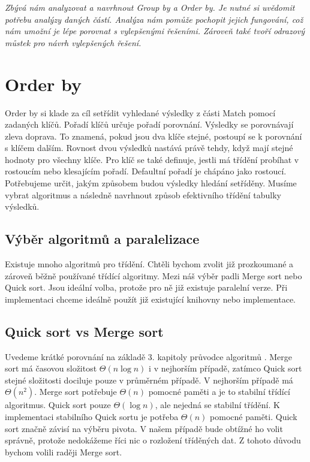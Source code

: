 \bigskip
\textit{Zbývá nám analyzovat a navrhnout Group by a Order by.
Je nutné si uvědomit potřebu analýzy daných částí.
Analýza nám pomůže pochopit jejich fungování, což nám umožní je lépe porovnat s vylepšenými řešeními. 
Zároveň také tvoří odrazový můstek pro návrh vylepšených řešení.}


\section{Order by}

Order by si klade za cíl setřídit vyhledané výsledky z části Match pomocí zadaných klíčů.
Pořadí klíčů určuje pořadí porovnání.
Výsledky se porovnávají zleva doprava.
To znamená, pokud jsou dva klíče stejné, postoupí se k porovnání s klíčem dalším.
Rovnost dvou výsledků nastává právě tehdy, když mají stejné hodnoty pro všechny klíče. 
Pro klíč se také definuje, jestli má třídění probíhat v rostoucím nebo klesajícím pořadí.
Defaultní pořadí je chápáno jako rostoucí. 
Potřebujeme určit, jakým způsobem budou výsledky hledání setříděny.
Musíme vybrat algoritmus a následně navrhnout způsob efektivního třídění tabulky výsledků.

\subsection{Výběr algoritmů a paralelizace}

Existuje mnoho algoritmů pro třídění.
Chtěli bychom zvolit již prozkoumané a zároveň běžně používané třídící algoritmy.
Mezi náš výběr padli Merge sort nebo Quick sort.
Jsou ideální volba, protože pro ně již existuje paralelní verze.
Při implementaci chceme ideálně použít již existující knihovny nebo implementace. 

\subsection{Quick sort vs Merge sort}

Uvedeme krátké porovnání na základě 3. kapitoly průvodce algoritmů \citep{labyrint}. 
Merge sort má časovou složitost $ \Theta(n\log n) $ i v nejhorším případě, zatímco Quick sort stejné složitosti dociluje pouze v průměrném případě.
V nejhorším případě má $\Theta(n^2)$.
Merge sort potřebuje $\Theta(n)$ pomocné paměti a je to stabilní třídící algoritmus.
Quick sort pouze $\Theta(\log n)$, ale nejedná se stabilní třídění.
K implementaci stabilního Quick sortu je potřeba $\Theta(n)$ pomocné paměti.
Quick sort značně závisí na výběru pivota.
V našem případě bude obtížné ho volit správně, protože nedokážeme říci nic o rozložení tříděných dat.
Z tohoto důvodu bychom volili raději Merge sort.  

